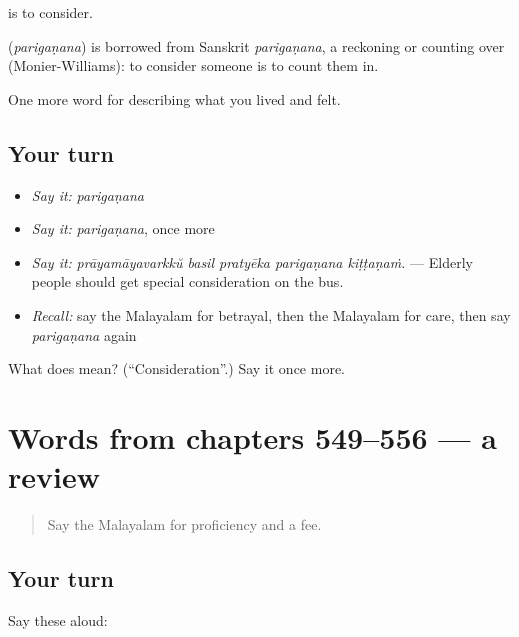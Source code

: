  is to consider.

\begin{cousinweb}
\textbf{} (\emph{parigaṇana}) is borrowed from Sanskrit \emph{parigaṇana}, a reckoning or counting over (Monier-Williams): to consider someone is to count them in.
\end{cousinweb}

\begin{grammarlens}[title={What you've built}]
One more word for describing what you lived and felt.
\end{grammarlens}

\subsection*{Your turn}
\begin{itemize}
\raggedright
  \item \emph{Say it:} \emph{parigaṇana}
  \item \emph{Say it:} \emph{parigaṇana}, once more
  \item \emph{Say it:} \emph{prāyamāyavarkkŭ basil pratyēka parigaṇana kiṭṭaṇaṁ.} — Elderly people should get special consideration on the bus.
  \item \emph{Recall:} say the Malayalam for betrayal, then the Malayalam for care, then say \emph{parigaṇana} again
\end{itemize}

\begin{tcolorbox}[breakable,colback=teal!4,colframe=teal!35!black,title={Before you move on}]
What does  mean? (\textquotedblleft{}Consideration\textquotedblright{}.) Say it once more.
\end{tcolorbox}
\section[(dialogue)]{Words from chapters 549–556 — a review}

\label{lesson:ML-R556-review-549-556}



\begin{quote}
Say the Malayalam for proficiency and a fee.
\end{quote}

\subsection*{Your turn}
Say these aloud:

